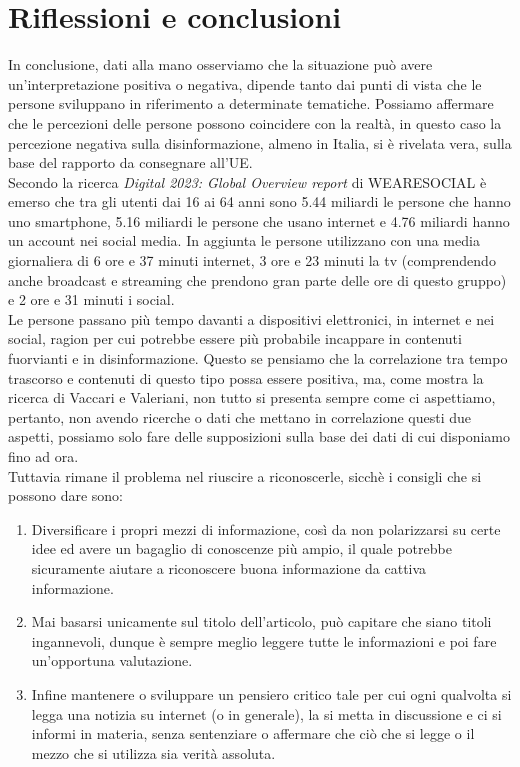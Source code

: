 \documentclass{article}
\begin{document}
\centering
\newpage\section{Riflessioni e conclusioni}
\begin{justify}
    In conclusione, dati alla mano osserviamo che la situazione può avere un'interpretazione positiva o negativa, dipende tanto dai punti di vista che le persone sviluppano in riferimento a determinate tematiche. Possiamo affermare che le percezioni delle persone possono coincidere con la realtà, in questo caso la percezione negativa sulla disinformazione, almeno in Italia, si è rivelata vera, sulla base del rapporto da consegnare all'UE.\\
    Secondo la ricerca \textit{Digital 2023: Global Overview report} di WEARESOCIAL è emerso che tra gli utenti dai 16 ai 64 anni sono 5.44 miliardi le persone che hanno uno smartphone, 5.16 miliardi le persone che usano internet e 4.76 miliardi hanno un account nei social media. In aggiunta le persone utilizzano con una media giornaliera di 6 ore e 37 minuti internet, 3 ore e 23 minuti la tv (comprendendo anche broadcast e streaming che prendono gran parte delle ore di questo gruppo) e 2 ore e 31 minuti i social.\citep{WEARESOCIAL}\\
    Le persone passano più tempo davanti a dispositivi elettronici, in internet e nei social, ragion per cui potrebbe essere più probabile incappare in contenuti fuorvianti e in disinformazione. Questo se pensiamo che la correlazione tra tempo trascorso e contenuti di questo tipo possa essere positiva, ma, come mostra la ricerca di Vaccari e Valeriani, non tutto si presenta sempre come ci aspettiamo, pertanto, non avendo ricerche o dati che mettano in correlazione questi due aspetti, possiamo solo fare delle supposizioni sulla base dei dati di cui disponiamo fino ad ora.\citep{vaccari_outside_2021}\\
    Tuttavia rimane il problema nel riuscire a riconoscerle, sicchè i consigli che si possono dare sono:
    \begin{enumerate}
    \item Diversificare i propri mezzi di informazione, così da non polarizzarsi su certe idee ed avere un bagaglio di conoscenze più ampio, il quale potrebbe sicuramente aiutare a riconoscere buona informazione da cattiva informazione.
    \item Mai basarsi unicamente sul titolo dell'articolo, può capitare che siano titoli ingannevoli, dunque è sempre meglio leggere tutte le informazioni e poi fare un'opportuna valutazione.
    \item Infine mantenere o sviluppare un pensiero critico tale per cui ogni qualvolta si legga una notizia su internet (o in generale), la si metta in discussione e ci si informi in materia, senza sentenziare o affermare che ciò che si legge o il mezzo che si utilizza sia verità assoluta.
    \end{enumerate}
\end{justify}
\newpage
\begin{justify}
    
    
\end{justify}
    
\end{document}
